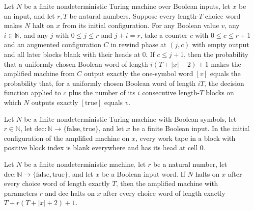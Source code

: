 \begin{theorem}
\label{Randomized.Amplify.rewind_prob}
\leanok
{}
Let $N$ be a finite nondeterministic Turing machine over Boolean inputs, let $x$ be an
input, and let $r,T$ be natural numbers. Suppose every length-$T$ choice word makes $N$
halt on $x$ from its initial configuration. For any Boolean value $v$, any $i\in\mathbb
N$, and any $j$ with $0\le j\le r$ and $j+i=r$, take a counter $c$ with $0\le c\le r+1$
and an augmented configuration $C$ in rewind phase at $(j,c)$ with empty output and all
later blocks blank with their heads at $0$. If $c\le j+1$, then the probability that a
uniformly chosen Boolean word of length $i(T+|x|+2)+1$ makes the amplified machine from
$C$ output exactly the one-symbol word $[v]$ equals the probability that, for a
uniformly chosen Boolean word of length $iT$, the decision function applied to $c$ plus
the number of its $i$ consecutive length-$T$ blocks on which $N$ outputs exactly
$[\mathrm{true}]$ equals $v$.
\end{theorem}

\begin{theorem}
\label{Randomized.Amplify.fresh_init}
\leanok
{}
Let $N$ be a finite nondeterministic Turing machine with Boolean symbols, let
$r\in\mathbb{N}$, let $\mathrm{dec}:\mathbb{N}\to\{\mathrm{false},\mathrm{true}\}$, and
let $x$ be a finite Boolean input. In the initial configuration of the amplified machine
on $x$, every work tape in a block with positive block index is blank everywhere and has
its head at cell $0$.
\end{theorem}

\begin{theorem}
\label{Randomized.Amplify.amp_haltsWithin}
\leanok
{}
Let $N$ be a finite nondeterministic machine, let $r$ be a natural number, let
$\mathrm{dec}:\mathbb{N}\to\{\mathrm{false},\mathrm{true}\}$, and let $x$ be a Boolean
input word. If $N$ halts on $x$ after every choice word of length exactly $T$, then the
amplified machine with parameters $r$ and $\mathrm{dec}$ halts on $x$ after every choice
word of length exactly $T+r(T+|x|+2)+1$.
\end{theorem}

